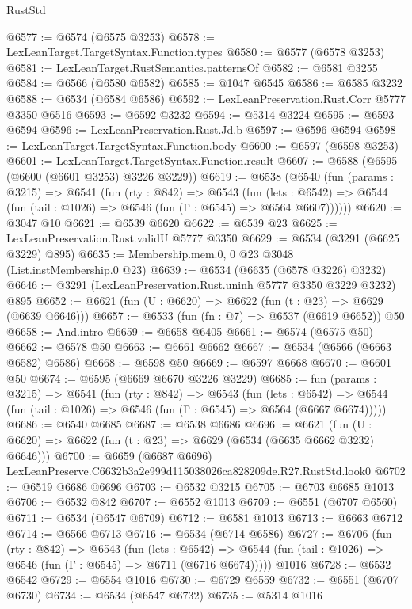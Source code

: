 \begin{lexlean}{RustStd}
\begin{coremodule}
@6577 := @6574 (@6575 @3253)
@6578 := LexLeanTarget.TargetSyntax.Function.types
@6580 := @6577 (@6578 @3253)
@6581 := LexLeanTarget.RustSemantics.patternsOf
@6582 := @6581 @3255
@6584 := @6566 (@6580 @6582)
@6585 := @1047 @6545
@6586 := @6585 @3232
@6588 := @6534 (@6584 @6586)
@6592 := LexLeanPreservation.Rust.Corr @5777 @3350 @6516
@6593 := @6592 @3232
@6594 := @5314 @3224
@6595 := @6593 @6594
@6596 := LexLeanPreservation.Rust.Jd.b
@6597 := @6596 @6594
@6598 := LexLeanTarget.TargetSyntax.Function.body
@6600 := @6597 (@6598 @3253)
@6601 := LexLeanTarget.TargetSyntax.Function.result
@6607 := @6588 (@6595 (@6600 (@6601 @3253) @3226 @3229))
@6619 := @6538
    (@6540
      (fun (params : @3215) =>
      @6541
        (fun (rty : @842) =>
        @6543
          (fun (lets : @6542) =>
          @6544 (fun (tail : @1026) => @6546 (fun (Γ : @6545) => @6564 @6607))))))
@6620 := @3047 @10
@6621 := @6539 @6620
@6622 := @6539 @23
@6625 := LexLeanPreservation.Rust.validU @5777 @3350
@6629 := @6534 (@3291 (@6625 @3229) @895)
@6635 := Membership.mem.{0, 0} @23 @3048 (List.instMembership.{0} @23)
@6639 := @6534 (@6635 (@6578 @3226) @3232)
@6646 := @3291 (LexLeanPreservation.Rust.uninh @5777 @3350 @3229 @3232) @895
@6652 := @6621 (fun (U : @6620) => @6622 (fun (t : @23) => @6629 (@6639 @6646)))
@6657 := @6533 (fun (fn : @7) => @6537 (@6619 @6652)) @50
@6658 := And.intro
@6659 := @6658 @6405
@6661 := @6574 (@6575 @50)
@6662 := @6578 @50
@6663 := @6661 @6662
@6667 := @6534 (@6566 (@6663 @6582) @6586)
@6668 := @6598 @50
@6669 := @6597 @6668
@6670 := @6601 @50
@6674 := @6595 (@6669 @6670 @3226 @3229)
@6685 := fun (params : @3215) =>
  @6541
    (fun (rty : @842) =>
    @6543
      (fun (lets : @6542) =>
      @6544 (fun (tail : @1026) => @6546 (fun (Γ : @6545) => @6564 (@6667 @6674)))))
@6686 := @6540 @6685
@6687 := @6538 @6686
@6696 := @6621 (fun (U : @6620) => @6622 (fun (t : @23) => @6629 (@6534 (@6635 @6662 @3232) @6646)))
@6700 := @6659 (@6687 @6696) LexLeanPreserve.C6632b3a2e999d115038026ca828209de.R27.RustStd.look0
@6702 := @6519 @6686 @6696
@6703 := @6532 @3215
@6705 := @6703 @6685 @1013
@6706 := @6532 @842
@6707 := @6552 @1013
@6709 := @6551 (@6707 @6560)
@6711 := @6534 (@6547 @6709)
@6712 := @6581 @1013
@6713 := @6663 @6712
@6714 := @6566 @6713
@6716 := @6534 (@6714 @6586)
@6727 := @6706
    (fun (rty : @842) =>
    @6543
      (fun (lets : @6542) =>
      @6544 (fun (tail : @1026) => @6546 (fun (Γ : @6545) => @6711 (@6716 @6674)))))
    @1016
@6728 := @6532 @6542
@6729 := @6554 @1016
@6730 := @6729 @6559
@6732 := @6551 (@6707 @6730)
@6734 := @6534 (@6547 @6732)
@6735 := @5314 @1016

\end{coremodule}
\end{lexlean}
